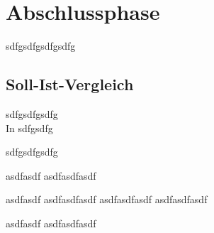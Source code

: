 \section{Abschlussphase}
\label{sec:Abschlussphase}
sdfgsdfgsdfgsdfg

\subsection{Soll-Ist-Vergleich}
\label{sub:Soll-Ist-Vergleich}
sdfgsdfgsdfg \\
\endgroup
In  sdfgsdfg

sdfgsdfgsdfg


\parencite{CCCCC} asdfasdf
\cite{CCCCC} asdfasdfasdf

\parencite{BBBBB} asdfasdf
\cite{BBBBB} asdfasdfasdf
\parencite[vgl.][aa]{BBBBB} asdfasdfasdf
\parencite[vgl.]{BBBBB} asdfasdfasdf

\parencite{AAAAA} asdfasdf
\cite{AAAAA} asdfasdfasdf
